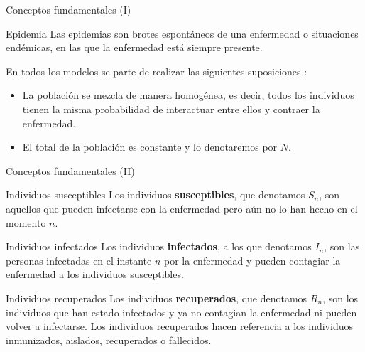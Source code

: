 \begin{frame}{Conceptos fundamentales (I)}

    \begin{block}{Epidemia}
        Las epidemias son brotes espontáneos de una enfermedad o situaciones endémicas, en las que la enfermedad está siempre presente.
    \end{block}  

    \pause

    En todos los modelos se parte de realizar las siguientes suposiciones \cite{allenDiscretetimeSISIR1994}:

    \begin{itemize}
        \item La población se mezcla de manera homogénea, es decir, todos los individuos tienen la misma probabilidad de interactuar entre ellos y contraer la enfermedad.
        \item El total de la población es constante y lo denotaremos por $N$.
    \end{itemize}

\end{frame}


\begin{frame}{Conceptos fundamentales (II)}

    \begin{block}{Individuos susceptibles}
        Los individuos \textbf{susceptibles}, que denotamos $S_n$, son aquellos que pueden infectarse con la enfermedad pero aún no lo han hecho en el momento $n$.
    \end{block}  

    \pause

    \begin{block}{Individuos infectados}
        Los individuos \textbf{infectados}, a los que denotamos $I_n$, son las personas infectadas en el instante $n$ por la enfermedad y pueden contagiar la enfermedad a los individuos susceptibles.
    \end{block}  

    \pause

    \begin{block}{Individuos recuperados}
        Los individuos \textbf{recuperados}, que denotamos $R_n$, son los individuos que han estado infectados y ya no contagian la enfermedad ni pueden volver a infectarse.
        Los individuos recuperados hacen referencia a los individuos inmunizados, aislados, recuperados o fallecidos.
    \end{block}  


\end{frame}


